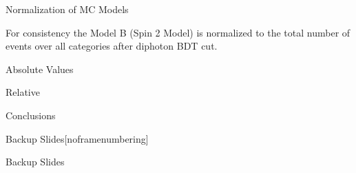 \documentclass[8pt]{beamer}
\begin{document}
\begin{frame}{Normalization of MC Models}

  For consistency the Model B (Spin 2 Model) is normalized to the total number of events over all categories after diphoton BDT 
  cut. 
  \begin{block}{Absolute Values}

    \resizebox{\linewidth}{!}{
    
    }
    
  \end{block}

  \begin{block}{Relative}

    \resizebox{\linewidth}{!}{
    
    }    

  \end{block}
  
\end{frame}

\begin{frame}{Conclusions}
 
 
\end{frame}

\begin{frame}{Backup Slides}[noframenumbering]
 
 \begin{huge}Backup Slides\end{huge}
 
\end{frame}
\end{document}
